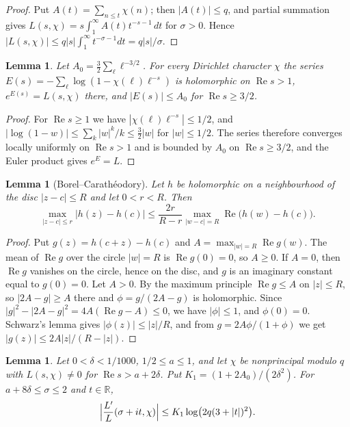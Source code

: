 \documentclass[12pt]{amsart}
\numberwithin{equation}{section}
\newtheorem{lemma}[theorem]{Lemma}
\theoremstyle{definition}
\renewcommand{\Re}{\operatorname{Re}}
\newcommand{\R}{\mathbb{R}}
\begin{document}
\begin{proof}
Put $A(t)=\sum_{n\le t}\chi(n)$; then $|A(t)|\le q$, and partial summation gives
$L(s,\chi)=s\int_1^\infty A(t)t^{-s-1}\,dt$ for $\sigma>0$. Hence
$|L(s,\chi)|\le q|s|\int_1^\infty t^{-\sigma-1}dt=q|s|/\sigma$.
\end{proof}

\begin{lemma}\label{lem:euler}
Let $A_0=\frac32\sum_\ell\ell^{-3/2}$. For every Dirichlet character $\chi$ the series
$E(s)=-\sum_\ell\log(1-\chi(\ell)\ell^{-s})$ is holomorphic on $\Re s>1$, $e^{E(s)}=L(s,\chi)$
there, and $|E(s)|\le A_0$ for $\Re s\ge3/2$.
\end{lemma}

\begin{proof}
For $\Re s\ge1$ we have $|\chi(\ell)\ell^{-s}|\le1/2$, and $|\log(1-w)|\le\sum_k|w|^k/k
\le\frac32|w|$ for $|w|\le1/2$. The series therefore converges locally uniformly on $\Re s>1$
and is bounded by $A_0$ on $\Re s\ge3/2$, and the Euler product gives $e^E=L$.
\end{proof}

\begin{lemma}[Borel--Carath\'eodory]\label{lem:bc}
Let $h$ be holomorphic on a neighbourhood of the disc $|z-c|\le R$ and let $0<r<R$. Then
\[
  \max_{|z-c|\le r}|h(z)-h(c)|\le\frac{2r}{R-r}\max_{|w-c|=R}\Re\bigl(h(w)-h(c)\bigr).
\]
\end{lemma}

\begin{proof}
Put $g(z)=h(c+z)-h(c)$ and $A=\max_{|w|=R}\Re g(w)$. The mean of $\Re g$ over the circle
$|w|=R$ is $\Re g(0)=0$, so $A\ge0$. If $A=0$, then $\Re g$ vanishes on the circle, hence on the
disc, and $g$ is an imaginary constant equal to $g(0)=0$. Let $A>0$. By the maximum principle
$\Re g\le A$ on $|z|\le R$, so $|2A-g|\ge A$ there and $\phi=g/(2A-g)$ is holomorphic. Since
$|g|^2-|2A-g|^2=4A(\Re g-A)\le0$, we have $|\phi|\le1$, and $\phi(0)=0$. Schwarz's lemma gives
$|\phi(z)|\le|z|/R$, and from $g=2A\phi/(1+\phi)$ we get $|g(z)|\le2A|z|/(R-|z|)$.
\end{proof}

\begin{lemma}\label{lem:logderiv}
Let $0<\delta<1/1000$, $1/2\le a\le1$, and let $\chi$ be nonprincipal modulo $q$ with
$L(s,\chi)\ne0$ for $\Re s>a+2\delta$. Put $K_1=(1+2A_0)/(2\delta^2)$. For
$a+8\delta\le\sigma\le2$ and $t\in\R$,
\[
  \Bigl|\frac{L'}{L}(\sigma+it,\chi)\Bigr|\le K_1\log\bigl(2q(3+|t|)^2\bigr).
\]
\end{lemma}
\end{document}
